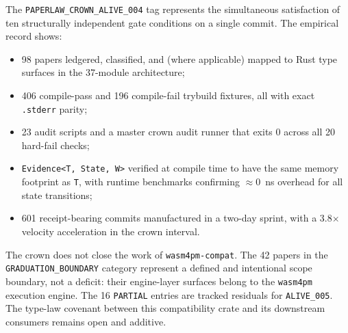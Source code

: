 The \texttt{PAPERLAW\_CROWN\_ALIVE\_004} tag represents the simultaneous
satisfaction of ten structurally independent gate conditions on a single commit.
The empirical record shows:

\begin{itemize}
  \item 98 papers ledgered, classified, and (where applicable) mapped to Rust type
    surfaces in the 37-module architecture;
  \item 406 compile-pass and 196 compile-fail trybuild fixtures, all with exact
    \texttt{.stderr} parity;
  \item 23 audit scripts and a master crown audit runner that exits 0 across all
    20 hard-fail checks;
  \item \texttt{Evidence<T, State, W>} verified at compile time to have the same
    memory footprint as \texttt{T}, with runtime benchmarks confirming
    $\approx 0$~ns overhead for all state transitions;
  \item 601 receipt-bearing commits manufactured in a two-day sprint, with a
    3.8$\times$ velocity acceleration in the crown interval.
\end{itemize}

The crown does not close the work of \texttt{wasm4pm-compat}. The 42 papers in
the \texttt{GRADUATION\_BOUNDARY} category represent a defined and intentional
scope boundary, not a deficit: their engine-layer surfaces belong to the
\texttt{wasm4pm} execution engine. The 16 \texttt{PARTIAL} entries are tracked
residuals for \texttt{ALIVE\_005}. The type-law covenant between this
compatibility crate and its downstream consumers remains open and additive.
